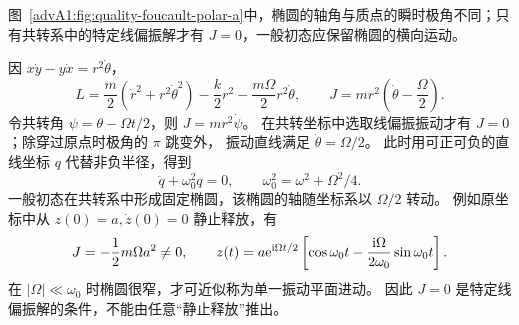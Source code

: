 \begin{advsolution}
\begin{qualityfigure}
\label{advA1:fig:quality-foucault-polar-a}
\end{qualityfigure}
图~\ref{advA1:fig:quality-foucault-polar-a}中，椭圆的轴角与质点的瞬时极角不同；只有共转系中的特定线偏振解才有 $J=0$，一般初态应保留椭圆的横向运动。

因 $x\dot y-y\dot x=r^2\dot\theta$，
\[
 L=\frac m2(\dot r^2+r^2\dot\theta^2)-\frac k2r^2
 -\frac{m\Omega}{2}r^2\dot\theta,
 \qquad J=mr^2\left(\dot\theta-\frac\Omega2\right).
\]
令共转角 $\psi=\theta-\Omega t/2$，则 $J=mr^2\dot\psi$。
在共转坐标中选取线偏振振动才有 $J=0$；除穿过原点时极角的 $\pi$ 跳变外，
振动直线满足 $\dot\theta=\Omega/2$。
此时用可正可负的直线坐标 $q$ 代替非负半径，得到
\[
 \ddot q+\omega_0^2q=0,\qquad \omega_0^2=\omega^2+\Omega^2/4.
\]
一般初态在共转系中形成固定椭圆，该椭圆的轴随坐标系以 $\Omega/2$ 转动。
例如原坐标中从 $z(0)=a,\dot z(0)=0$ 静止释放，有
\[
 J=-\frac12m\Omega a^2\ne0,\qquad
 z(t)=a\mathrm e^{\mathrm i\Omega t/2}
 \left[\cos\omega_0t-\frac{\mathrm i\Omega}{2\omega_0}\sin\omega_0t\right].
\]
在 $|\Omega|\ll\omega_0$ 时椭圆很窄，才可近似称为单一振动平面进动。
因此 $J=0$ 是特定线偏振解的条件，不能由任意“静止释放”推出。

\end{advsolution}

